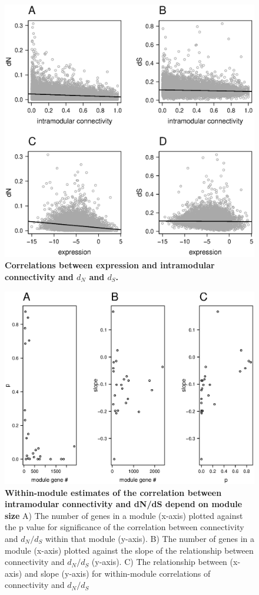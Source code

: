 \begin{figure}[ht!]
      \centering
       \includegraphics[width=\linewidth]{Ch4FigCorr}
    \caption{\textbf{Correlations between expression and intramodular connectivity and $d_{N}$ and $d_{S}$.}}
    \label{fig:fsCorr}
\end{figure}


\begin{figure}[ht!]
      \centering
       \includegraphics[width=\linewidth]{Ch4FigMod}
    \caption{\textbf{Within-module estimates of the correlation between intramodular connectivity and dN/dS depend on module size} A) The number of genes in a module (x-axis) plotted against the p value for significance of the correlation between connectivity and $d_{N}/d_{S}$ within that module (y-axis). B) The number of genes in a module (x-axis) plotted against the slope of the relationship between connectivity and $d_{N}/d_{S}$ (y-axis). C) The relationship between (x-axis) and slope (y-axis) for within-module correlations of connectivity and $d_{N}/d_{S}$}
    \label{fig:fsMod}
\end{figure}




